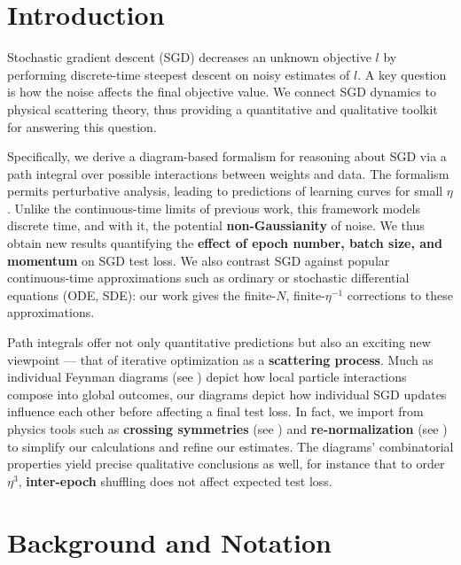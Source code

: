 \documentclass{article}
\begin{document}
\section{Introduction}
    Stochastic gradient descent (SGD) decreases an unknown objective $l$ by
    performing discrete-time steepest descent on noisy estimates of $l$.  A key
    question is how the noise affects the final objective value.  We connect
    SGD dynamics to physical scattering theory, thus providing a quantitative
    and qualitative toolkit for answering this question.

    Specifically, we derive a diagram-based formalism for reasoning about SGD
    via a path integral over possible interactions between weights and data.
    The formalism permits perturbative analysis, leading to predictions of
    learning curves for small $\eta$.  Unlike the continuous-time limits of
    previous work, this framework models discrete time, and with it, the
    potential {\bf non-Gaussianity} of noise.  We thus obtain new results
    quantifying the {\bf effect of epoch number, batch size, and momentum} on
    SGD test loss.  We also contrast SGD against popular continuous-time
    approximations such as ordinary or stochastic differential equations (ODE,
    SDE): our work gives the finite-$N$, finite-$\eta^{-1}$ corrections to 
    these approximations.
    
    Path integrals offer not only quantitative predictions but also an exciting
    new viewpoint --- that of iterative optimization as a {\bf scattering
    process}.  Much as individual Feynman diagrams (see \citet{dy49a}) depict
    how local particle interactions compose into global outcomes, our diagrams
    depict how individual SGD updates influence each other before affecting a
    final test loss.  In fact, we import from physics tools such as {\bf
    crossing symmetries} (see \citet{dy49b}) and {\bf re-normalization} (see
    \citet{ge54}) to simplify our calculations and refine our estimates.  The
    diagrams' combinatorial properties yield precise qualitative conclusions as
    well, for instance that to order $\eta^3$, {\bf inter-epoch} shuffling does
    not affect expected test loss.



\section{Background and Notation}
\end{document}
